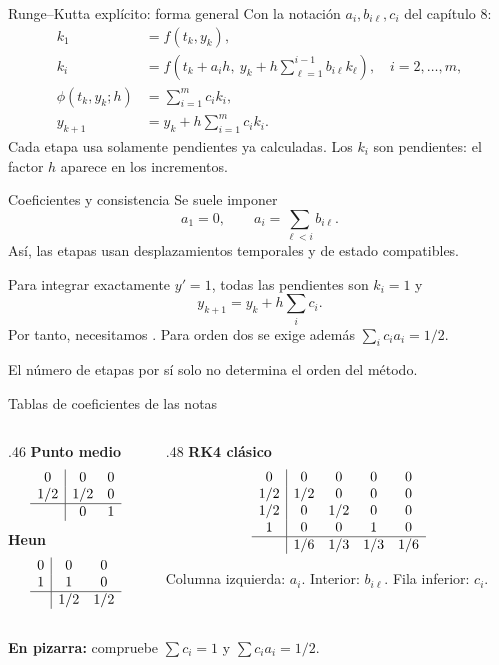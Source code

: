 \documentclass[aspectratio=169,12pt]{beamer}
\begin{document}
\begin{frame}{Runge--Kutta explícito: forma general}
Con la notación $a_i,b_{i\ell},c_i$ del capítulo 8:
\begin{align*}
k_1&=f(t_k,y_k),\\
k_i&=f\!\left(t_k+a_i h,\ y_k+h\sum_{\ell=1}^{i-1}b_{i\ell}k_\ell\right),
\quad i=2,\ldots,m,\\
\phi(t_k,y_k;h)&=\sum_{i=1}^m c_i k_i,\\
y_{k+1}&=y_k+h\sum_{i=1}^m c_i k_i.
\end{align*}
Cada etapa usa solamente pendientes ya calculadas.
Los $k_i$ son pendientes: el factor $h$ aparece en los incrementos.
\end{frame}

\begin{frame}{Coeficientes y consistencia}
Se suele imponer
\[a_1=0,\qquad a_i=\sum_{\ell<i}b_{i\ell}.\]
Así, las etapas usan desplazamientos temporales y de estado compatibles.
\medskip

Para integrar exactamente $y'=1$, todas las pendientes son $k_i=1$ y
\[y_{k+1}=y_k+h\sum_i c_i.\]
Por tanto, necesitamos .
Para orden dos se exige además $\sum_i c_i a_i=1/2$.
\medskip

El número de etapas por sí solo no determina el orden del método.
\end{frame}

\begin{frame}{Tablas de coeficientes de las notas}
\begin{columns}[T,onlytextwidth]
\begin{column}{.46\textwidth}
\centering\textbf{Punto medio}
\[\begin{array}{c|cc}0&0&0\\1/2&1/2&0\\\hline &0&1\end{array}\]
\textbf{Heun}
\[\begin{array}{c|cc}0&0&0\\1&1&0\\\hline &1/2&1/2\end{array}\]
\end{column}
\begin{column}{.48\textwidth}
\centering\textbf{RK4 clásico}
\[\begin{array}{c|cccc}
0&0&0&0&0\\
1/2&1/2&0&0&0\\
1/2&0&1/2&0&0\\
1&0&0&1&0\\\hline
&1/6&1/3&1/3&1/6
\end{array}\]
\raggedright\small Columna izquierda: $a_i$. Interior: $b_{i\ell}$. Fila inferior: $c_i$.
\end{column}
\end{columns}
\medskip
\textbf{En pizarra:} compruebe $\sum c_i=1$ y $\sum c_i a_i=1/2$.
\end{frame}
\end{document}
